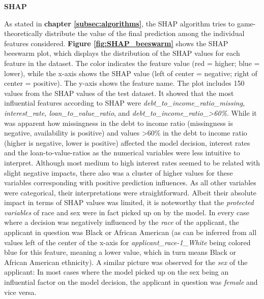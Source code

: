 \textbf{SHAP}

As stated in \textbf{chapter \ref{subsec:algorithms}}, the SHAP algorithm tries to game-theoretically distribute the value of the final prediction among the individual features considered.
\textbf{Figure \ref{fig:SHAP_beeswarm}} shows the SHAP beeswarm plot, which displays the distribution of the SHAP values for each feature in the dataset. The color indicates the feature value (red = higher; blue = lower), while the x-axis shows the SHAP value (left of center = negative; right of center = positive). The y-axis shows the feature name. The plot includes 150 values from the SHAP values of the test dataset.
It showed that the most influential features according to SHAP were \textit{debt\_to\_income\_ratio\_missing, interest\_rate, loan\_to\_value\_ratio}, and \textit{debt\_to\_income\_ratio\_>60\%}.
While it was apparent how missingness in the debt to income ratio (missingness is negative, availability is positive) and values >60\% in the debt to income ratio (higher is negative, lower is positive) affected the model decision, interest rates and the loan-to-value-ratios as the numerical variables were less intuitive to interpret.
Although most medium to high interest rates seemed to be related with slight negative impacts, there also was a cluster of higher values for these variables corresponding with positive prediction influences.
As all other variables were categorical, their interpretations were straightforward. Albeit their absolute impact in terms of SHAP values was limited, it is noteworthy that the \textit{protected variables} of race and sex were in fact picked up on by the model.
In every case where a decision was negatively influenced by the \textit{race} of the applicant, the applicant in question was Black or African American (as can be inferred from all values left of the center of the x-axis for \textit{applicant\_race-1\_White} being colored blue for this feature, meaning a lower value, which in turn means Black or African American ethnicity).
A similar picture was observed for the \textit{sex} of the applicant: In most cases where the model picked up on the sex being an influential factor on the model decision, the applicant in question was \textit{female} and vice versa.

